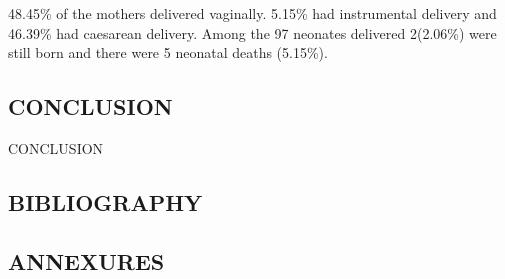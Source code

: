 \documentclass[14pt]{extarticle}
\begin{document}
48.45\% of the mothers delivered vaginally. 5.15\% had instrumental delivery and 46.39\% had caesarean delivery. Among the 97 neonates delivered 2(2.06\%) were still born and there were 5 neonatal deaths (5.15\%).

\newpage
\null
\vfill
\begin{flushright}
    \section{CONCLUSION}
\end{flushright}
\hrulefill
\newpage

CONCLUSION

\newpage
\null
\vfill
\begin{flushright}
    \section{BIBLIOGRAPHY}
\end{flushright}

\hrulefill
\newpage

\printbibliography[]

\newpage

\null
\vfill
\begin{flushright}
    \section{ANNEXURES}
\end{flushright}
\hrulefill
\newpage

\thispagestyle{empty}


\clearpage

\thispagestyle{empty}


\clearpage

\thispagestyle{empty}

\end{document}
